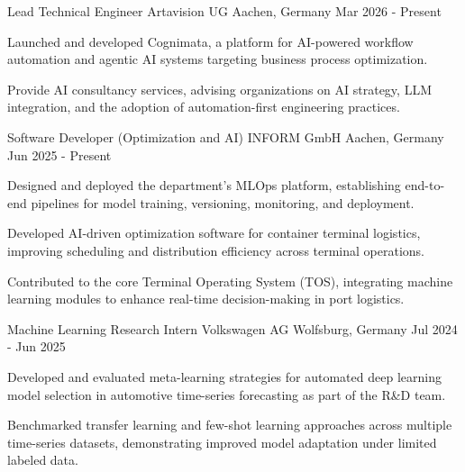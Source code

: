

\begin{cventries}

  \cventry
    {Lead Technical Engineer} %
    {Artavision UG} %
    {Aachen, Germany} %
    {Mar 2026 - Present} %
    {
      \begin{cvitems} %
        \item {Launched and developed Cognimata, a platform for AI-powered workflow automation and agentic AI systems targeting business process optimization.}
        \item {Provide AI consultancy services, advising organizations on AI strategy, LLM integration, and the adoption of automation-first engineering practices.}
      \end{cvitems}
    }

  \cventry
    {Software Developer (Optimization and AI)} %
    {INFORM GmbH} %
    {Aachen, Germany} %
    {Jun 2025 - Present} %
    {
      \begin{cvitems} %
        \item {Designed and deployed the department's MLOps platform, establishing end-to-end pipelines for model training, versioning, monitoring, and deployment.}
        \item {Developed AI-driven optimization software for container terminal logistics, improving scheduling and distribution efficiency across terminal operations.}
        \item {Contributed to the core Terminal Operating System (TOS), integrating machine learning modules to enhance real-time decision-making in port logistics.}
      \end{cvitems}
    }

  \cventry
    {Machine Learning Research Intern} %
    {Volkswagen AG} %
    {Wolfsburg, Germany} %
    {Jul 2024 - Jun 2025} %
    {
      \begin{cvitems} %
        \item {Developed and evaluated meta-learning strategies for automated deep learning model selection in automotive time-series forecasting as part of the R\&D team.}
        \item {Benchmarked transfer learning and few-shot learning approaches across multiple time-series datasets, demonstrating improved model adaptation under limited labeled data.}
      \end{cvitems}
    }


\end{cventries}
